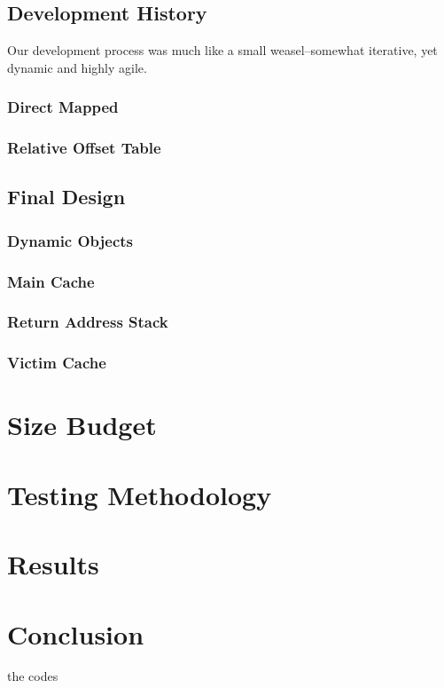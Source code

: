 \documentclass[twocolumn]{article}
\begin{document}
\subsection{Development History}
Our development process was much like a small weasel--somewhat iterative, yet dynamic and highly agile. 

\subsubsection{Direct Mapped}
\subsubsection{Relative Offset Table}
\subsection{Final Design}
\subsubsection{Dynamic Objects}
\subsubsection{Main Cache}
\subsubsection{Return Address Stack}
\subsubsection{Victim Cache}
\section{Size Budget}
\section{Testing Methodology}
\section{Results}
\section{Conclusion}
\appendix
the codes
\end{document}
